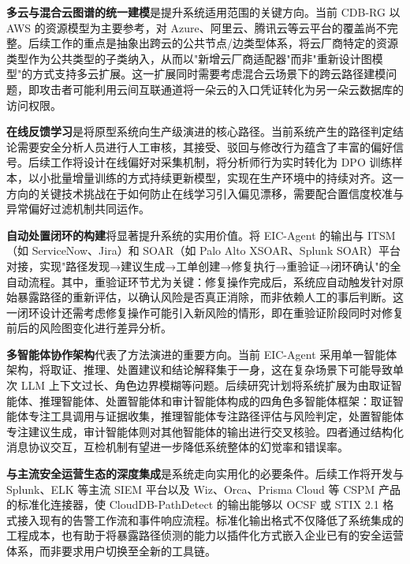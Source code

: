 \documentclass[a4paper,12pt]{ctexart}
\begin{document}
\textbf{多云与混合云图谱的统一建模}是提升系统适用范围的关键方向。当前 CDB-RG 以 AWS 的资源模型为主要参考，对 Azure、阿里云、腾讯云等云平台的覆盖尚不完整。后续工作的重点是抽象出跨云的公共节点/边类型体系，将云厂商特定的资源类型作为公共类型的子类纳入，从而以"新增云厂商适配器"而非"重新设计图模型"的方式支持多云扩展。这一扩展同时需要考虑混合云场景下的跨云路径建模问题，即攻击者可能利用云间互联通道将一朵云的入口凭证转化为另一朵云数据库的访问权限。

\textbf{在线反馈学习}是将原型系统向生产级演进的核心路径。当前系统产生的路径判定结论需要安全分析人员进行人工审核，其接受、驳回与修改行为蕴含了丰富的偏好信号。后续工作将设计在线偏好对采集机制，将分析师行为实时转化为 DPO 训练样本，以小批量增量训练的方式持续更新模型，实现在生产环境中的持续对齐。这一方向的关键技术挑战在于如何防止在线学习引入偏见漂移，需要配合置信度校准与异常偏好过滤机制共同运作。

\textbf{自动处置闭环的构建}将显著提升系统的实用价值。将 EIC-Agent 的输出与 ITSM（如 ServiceNow、Jira）和 SOAR（如 Palo Alto XSOAR、Splunk SOAR）平台对接，实现"路径发现→建议生成→工单创建→修复执行→重验证→闭环确认"的全自动流程。其中，重验证环节尤为关键：修复操作完成后，系统应自动触发针对原始暴露路径的重新评估，以确认风险是否真正消除，而非依赖人工的事后判断。这一闭环设计还需考虑修复操作可能引入新风险的情形，即在重验证阶段同时对修复前后的风险图变化进行差异分析。

\textbf{多智能体协作架构}代表了方法演进的重要方向。当前 EIC-Agent 采用单一智能体架构，将取证、推理、处置建议和结论解释集于一身，这在复杂场景下可能导致单次 LLM 上下文过长、角色边界模糊等问题。后续研究计划将系统扩展为由取证智能体、推理智能体、处置智能体和审计智能体构成的四角色多智能体框架：取证智能体专注工具调用与证据收集，推理智能体专注路径评估与风险判定，处置智能体专注建议生成，审计智能体则对其他智能体的输出进行交叉核验。四者通过结构化消息协议交互，互检机制有望进一步降低系统整体的幻觉率和错误率。

\textbf{与主流安全运营生态的深度集成}是系统走向实用化的必要条件。后续工作将开发与 Splunk、ELK 等主流 SIEM 平台以及 Wiz、Orca、Prisma Cloud 等 CSPM 产品的标准化连接器，使 CloudDB-PathDetect 的输出能够以 OCSF 或 STIX 2.1 格式接入现有的告警工作流和事件响应流程。标准化输出格式不仅降低了系统集成的工程成本，也有助于将暴露路径侦测的能力以插件化方式嵌入企业已有的安全运营体系，而非要求用户切换至全新的工具链。
\end{document}
